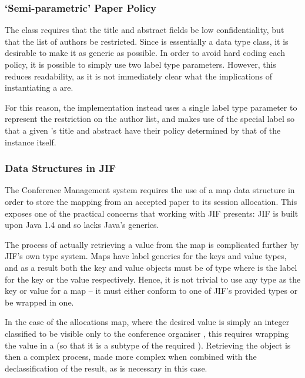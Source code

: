 \subsubsection{`Semi-parametric' Paper Policy}

The  class requires that the title and abstract fields be low confidentiality, but that the list of authors be restricted. Since  is essentially a data type class, it is desirable to make it as generic as possible. In order to avoid hard coding each policy, it is possible to simply use two label type parameters. However, this reduces readability, as it is not immediately clear what the implications of instantiating a  are.

For this reason, the implementation instead uses a single label type parameter to represent the restriction on the author list, and makes use of the special  label so that a given 's title and abstract have their policy determined by that of the instance itself.

\subsubsection{Data Structures in JIF}

The Conference Management system requires the use of a map data structure in order to store the mapping from an accepted paper to its session allocation. This exposes one of the practical concerns that working with JIF presents: JIF is built upon Java 1.4 and so lacks Java's generics.

The process of actually retrieving a value from the map is complicated further by JIF's own type system. Maps have label generics for the keys and value types, and as a result both the key and value objects must be of type  where  is the label for the key or the value respectively. Hence, it is not trivial to use any type as the key or value for a map -- it must either conform to one of JIF's provided types or be wrapped in one.

In the case of the allocations map, where the desired value is simply an integer classified to be visible only to the conference organiser , this requires wrapping the value in a  (so that it is a subtype of the required ). Retrieving the object is then a complex process, made more complex when combined with the declassification of the result, as is necessary in this case.

